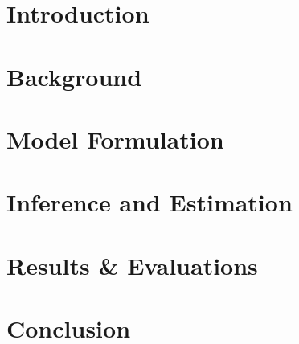 \documentclass[master,final,11pt]{iscs-thesis}
\date{\today}
\begin{document}
\begin{eabstract}

\end{eabstract}
\begin{jabstract}

\end{jabstract}
\maketitle
\switchinterim
\switchenglish
\frontmatter %
\tableofcontents %
\listoffigures %
\listoftables %
\listofalgorithms
\mainmatter %
\titlepage
\chapter{Introduction}\label{ch1}



\chapter{Background}\label{ch2}

\chapter{Model Formulation}\label{ch3}

\chapter{Inference and Estimation}\label{ch4}

\chapter{Results \& Evaluations}\label{ch5}

\chapter{Conclusion}\label{ch6}

\cite{wallach_rethinking_nodate}
%
\end{document}
